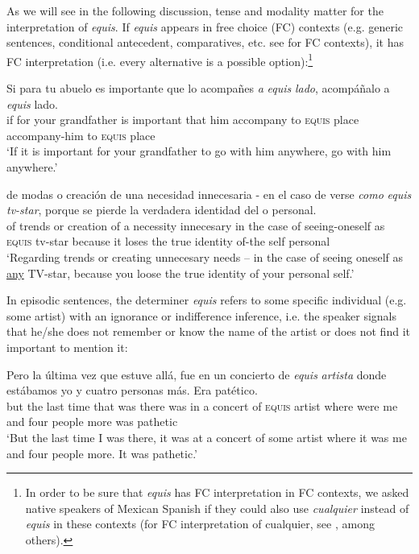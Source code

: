 \documentclass[output=paper
,modfonts
,nonflat]{langsci/langscibook}
\begin{document}
As we will see in the following discussion, tense and modality matter for the interpretation of \textit{equis}. If \textit{equis} appears in free choice (FC) contexts (e.g. generic sentences, conditional antecedent, comparatives, etc. see \citealt{Aloni2010} for FC contexts), it has FC interpretation (i.e. every alternative is a possible option):\footnote{In order to be sure that \textit{equis} has FC interpretation in FC contexts, we asked native speakers of Mexican Spanish if they could also use \textit{cualquier} instead of \textit{equis} in these contexts (for FC interpretation of cualquier, see \citealt{AM2011}, among others).}

\ea
\gll Si para tu abuelo es importante que lo acompañes \textit{a} \textit{equis} \textit{lado}, acompáñalo a \textit{equis} lado.\\
if for your grandfather is important that him accompany to \textsc{equis} place accompany-him to \textsc{equis} place\\
\glt ‘If it is important for your grandfather to go with him anywhere, go with him anywhere.’
\z

\ea
\gll de modas o creación de una necesidad innecesaria - en el caso de verse \textit{como} \textit{equis} \textit{tv-star}, porque se pierde la verdadera identidad del o personal.\\
of trends or creation of a necessity innecesary {} in the case of seeing-oneself as \textsc{equis} tv-star because it	loses the true identity of-the self personal\\
\glt ‘Regarding trends or creating unnecesary needs – in the case of seeing oneself as \underline{any} TV-star, because you loose the true identity of your personal self.’
\z

In episodic sentences, the determiner \textit{equis} refers to some specific individual (e.g. some artist) with an ignorance or indifference inference, i.e. the speaker signals that he/she does not remember or know the name of the artist or does not find it important to mention it:

\ea
\gll  Pero la última vez que estuve allá, fue en un concierto de \textit{equis} \textit{artista} donde estábamos yo y cuatro personas más. Era patético.\\
but the last time that was there was in a concert of \textsc{equis} artist where were me and four people more was pathetic
\\
\glt ‘But the last time I was there, it was at a concert of some artist where it was me and four people more. It was pathetic.’
\z
\end{document}
